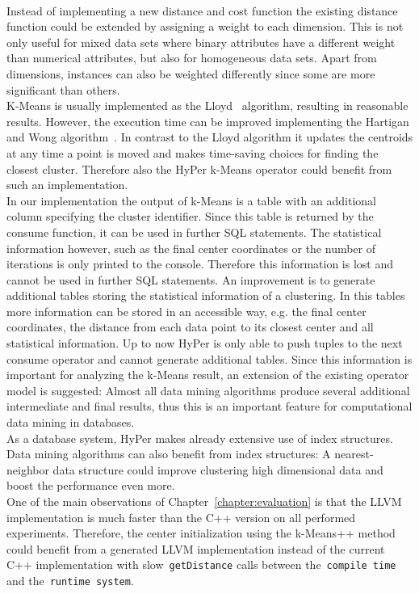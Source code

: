 \\
Instead of implementing a new distance and cost function the existing distance function could be extended by assigning a weight to each dimension. This is not only useful for mixed data sets where binary attributes have a different weight than numerical attributes, but also for homogeneous data sets. Apart from dimensions, instances can also be weighted differently since some are more significant than others.
\\
K-Means is usually implemented as the Lloyd~\parencite{Lloyd82} algorithm, resulting in reasonable results. However, the execution time can be improved implementing the Hartigan and Wong algorithm~\parencite{hartigan1979algorithm}. In contrast to the Lloyd algorithm it updates the centroids at any time a point is moved and makes time-saving choices for finding the closest cluster. Therefore also the HyPer k-Means operator could benefit from such an implementation.
\\
In our implementation the output of k-Means is a table with an additional column specifying the cluster identifier. Since this table is returned by the consume function, it can be used in further SQL statements. The statistical information however, such as the final center coordinates or the number of iterations is only printed to the console. Therefore this information is lost and cannot be used in further SQL statements. An improvement is to generate additional tables storing the statistical information of a clustering. In this tables more information can be stored in an accessible way, e.g. the final center coordinates, the distance from each data point to its closest center and all statistical information. Up to now HyPer is only able to push tuples to the next consume operator and cannot generate additional tables. Since this information is important for analyzing the k-Means result, an extension of the existing operator model is suggested: Almost all data mining algorithms produce several additional intermediate and final results, thus this is an important feature for computational data mining in databases.
\\
As a database system, HyPer makes already extensive use of index structures. Data mining algorithms can also benefit from index structures: A nearest-neighbor data structure could improve clustering high dimensional data and boost the performance even more.
\\
One of the main observations of Chapter~\ref{chapter:evaluation} is that the LLVM implementation is much faster than the C++ version on all performed experiments. Therefore, the center initialization using the k-Means++ method could benefit from a generated LLVM implementation instead of the current C++ implementation with slow~\texttt{getDistance} calls between the~\texttt{compile time} and the~\texttt{runtime system}.
